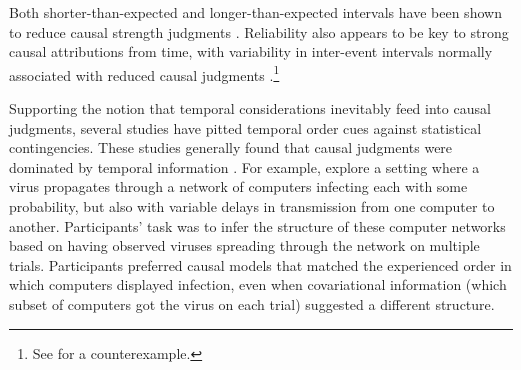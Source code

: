 \documentclass{cambridge7A}%
\begin{document}
Both shorter-than-expected and longer-than-expected intervals have been shown to reduce causal strength judgments \citep{buehner2004abolishing, schlottmann1999seeing,buehner2002knowledge,greville2010temporal,hagmayer2002temporal,buehner2003rethinking,greville2016temporal}.  Reliability also appears to be key to strong causal attributions from time, with variability in inter-event intervals normally associated with reduced causal judgments \citep{greville2010temporal,lagnado2010influence,greville2013structural}.\footnote{See \cite{young2009problem} for a counterexample.} 

Supporting the notion that temporal considerations inevitably feed into causal judgments, several studies have pitted temporal order cues against statistical contingencies.  These studies generally found that causal judgments were dominated by temporal information \citep{lagnado2006time,lagnado2004advantage,burns2009temporal,schlottmann1999seeing,frosch2012causal}.  For example,  \cite{lagnado2006time} explore a setting where a virus propagates through a network of computers infecting each with some probability, but also with variable delays in transmission from one computer to another. Participants' task was to infer the structure of these computer networks based on having observed viruses spreading through the network on multiple trials.  Participants preferred causal models that matched the experienced order in which computers displayed infection, even when covariational information (which subset of computers got the virus on each trial) suggested a different structure.



\end{document}
